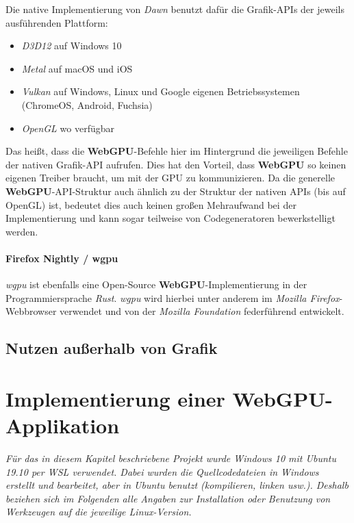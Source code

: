 \documentclass[oneside]{ausarbeitung}
\newcommand*{\quotize}[1]{\glqq #1\grqq}
\begin{document}
Die \quotize{native} Implementierung von \textit{Dawn} benutzt dafür die Grafik-APIs der jeweils ausführenden Plattform:

\begin{itemize}
\item{\textit{D3D12} auf Windows 10}
\item{\textit{Metal} auf macOS und iOS}
\item{\textit{Vulkan} auf Windows, Linux und Google eigenen Betriebssystemen (ChromeOS, Android, Fuchsia)}
\item{\textit{OpenGL} wo verfügbar}
\end{itemize}

Das heißt, dass die \textbf{WebGPU}-Befehle hier im Hintergrund die jeweiligen Befehle der nativen Grafik-API aufrufen. Dies hat den Vorteil, dass \textbf{WebGPU} so keinen eigenen Treiber braucht, um mit der \ac{GPU} zu kommunizieren. Da die generelle \textbf{WebGPU}-API-Struktur auch ähnlich zu der Struktur der nativen APIs (bis auf OpenGL) ist, bedeutet dies auch keinen großen Mehraufwand bei der Implementierung und kann sogar teilweise von Codegeneratoren bewerkstelligt werden.

\subsubsection{Firefox Nightly \cite{mozilla:firefox_nightly} / wgpu \cite{mozilla:wgpu}}
\textit{wgpu} ist ebenfalls eine Open-Source \textbf{WebGPU}-Implementierung in der Programmiersprache \textit{Rust}. \textit{wgpu} wird hierbei unter anderem im \textit{Mozilla Firefox}-Webbrowser verwendet und von der \textit{Mozilla Foundation} federführend entwickelt.
\section{Nutzen außerhalb von Grafik}

\chapter{Implementierung einer WebGPU-Applikation}
\label{cha:implementierung}
\textit{Für das in diesem Kapitel beschriebene Projekt wurde Windows 10 mit Ubuntu 19.10 per \ac{WSL} \cite{microsoft:wsl} verwendet. Dabei wurden die Quellcodedateien in Windows erstellt und bearbeitet, aber in Ubuntu benutzt (kompilieren, linken usw.). Deshalb beziehen sich im Folgenden alle Angaben zur Installation oder Benutzung von Werkzeugen auf die jeweilige Linux-Version.}
\end{document}
